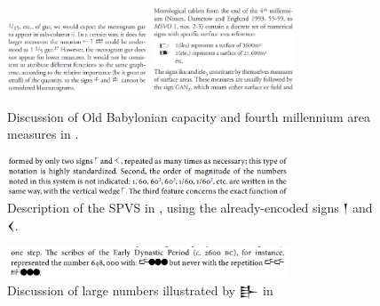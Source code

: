 \documentclass[10pt, a4paper, twoside]{article}
\newcommand\threeŊešTwoC{{\proposalfont\symbol{"1256D}}}
\newcommand\threeŊešʾuC{{\proposalfont\symbol{"12576}}}
\newcommand\threeŠarTwoC{{\proposalfont\symbol{"1257B}}}
\newcommand\threeŠarʾuC{{\proposalfont\symbol{"12584}}}
\begin{document}
\begin{figure}[H]
  \begin{center}
  \includegraphics[width=0.375\textwidth]{proust-9a.png}
  \includegraphics[width=0.375\textwidth]{proust-9.png}
  \caption[]{Discussion of Old Babylonian\footnotemark{} capacity and fourth millennium area measures in \cite[9]{Proust2009}.\label{proust9}}
  \end{center}
\end{figure}
\begin{figure}[H]
  \begin{center}
  \includegraphics[width=0.75\textwidth]{chambon-58.png}
  \caption{
    Description of the SPVS in \cite[58]{Chambon2012},
    using the already-encoded signs {\xsuxfont 𒁹} and {\xsuxfont 𒌋}.\label{chambon58}}
  \end{center}
\end{figure}
\begin{figure}[H]
  \begin{center}
  \includegraphics[width=0.75\textwidth]{chambon-59.png}
  \caption[]{Discussion of large numbers illustrated by {\xsuxfont 𒃲\threeŠarTwoC}\footnotemark{} in
                \cite[59]{Chambon2012}\label{chambon59}}
  \end{center}
\end{figure}
\end{document}
